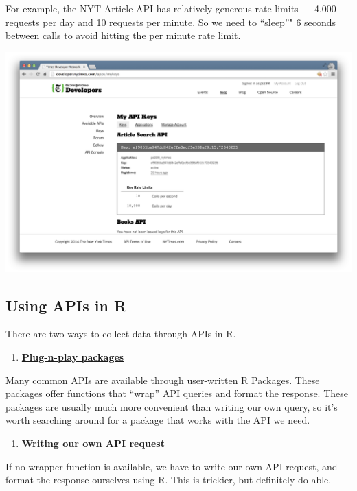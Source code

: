 \documentclass[]{book}
\providecommand{\tightlist}{%
  \setlength{\itemsep}{0pt}\setlength{\parskip}{0pt}}
\begin{document}
For example, the NYT Article API has relatively generous rate limits ---
4,000 requests per day and 10 requests per minute. So we need to
``sleep''" 6 seconds between calls to avoid hitting the per minute rate
limit.

\begin{center}\includegraphics[width=0.7\linewidth]{img/nytimes_key} \end{center}

\subsection{Using APIs in R}\label{using-apis-in-r}

There are two ways to collect data through APIs in R.

\begin{enumerate}
\def\labelenumi{\arabic{enumi}.}
\tightlist
\item
  \protect\hyperlink{collecting-twitter-data-with-rtweet}{\textbf{Plug-n-play
  packages}}
\end{enumerate}

Many common APIs are available through user-written R Packages. These
packages offer functions that ``wrap'' API queries and format the
response. These packages are usually much more convenient than writing
our own query, so it's worth searching around for a package that works
with the API we need.

\begin{enumerate}
\def\labelenumi{\arabic{enumi}.}
\setcounter{enumi}{1}
\tightlist
\item
  \protect\hyperlink{writing-api-queries}{\textbf{Writing our own API
  request}}
\end{enumerate}

If no wrapper function is available, we have to write our own API
request, and format the response ourselves using R. This is trickier,
but definitely do-able.
\end{document}
